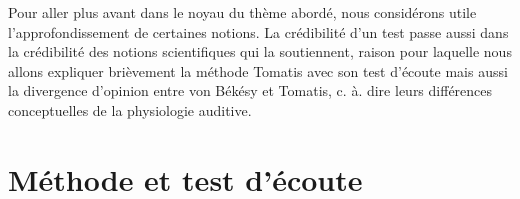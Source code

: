 

Pour aller plus avant dans le noyau du thème abordé, nous considérons utile
l'approfondissement de certaines notions. La crédibilité d'un test passe aussi dans la crédibilité des 
notions scientifiques qui la soutiennent, raison pour laquelle nous allons expliquer brièvement  la 
méthode Tomatis avec son test d'écoute mais aussi la
divergence d'opinion entre von Békésy et Tomatis, c. à. dire leurs différences conceptuelles de la 
physiologie auditive. 
\section{Méthode et test d'écoute}

